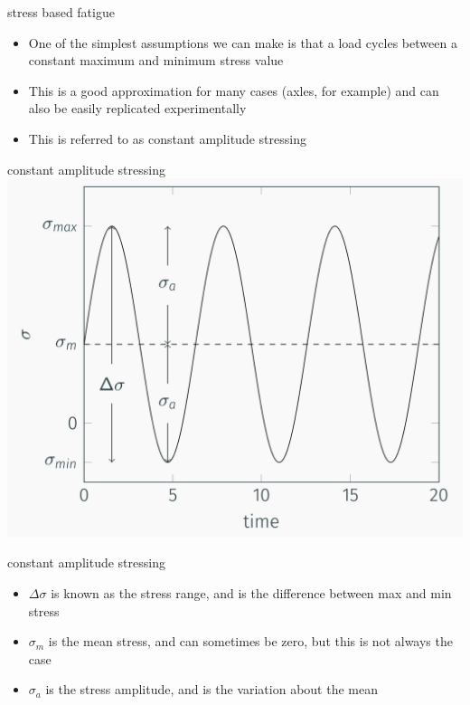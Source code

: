 \documentclass[
  letterpaper,
  ignorenonframetext,
  aspectratio=43,
  handout,
  12pt]{beamer}
\providecommand{\tightlist}{%
  \setlength{\itemsep}{0pt}\setlength{\parskip}{0pt}}
\providecommand{\tightlist}{%
\setlength{\itemsep}{0pt}\setlength{\parskip}{0pt}}
\let\Oldincludegraphics\includegraphics
\renewcommand{\includegraphics}[2][]{\Oldincludegraphics[width=\textwidth,height=0.7\textheight,keepaspectratio]{#2}}
\begin{document}
\begin{frame}{stress based fatigue}
\protect\hypertarget{stress-based-fatigue}{}
\begin{itemize}
\tightlist
\item
  One of the simplest assumptions we can make is that a load cycles
  between a constant maximum and minimum stress value
\item
  This is a good approximation for many cases (axles, for example) and
  can also be easily replicated experimentally
\item
  This is referred to as constant amplitude stressing
\end{itemize}
\end{frame}

\begin{frame}{constant amplitude stressing}
\protect\hypertarget{constant-amplitude-stressing}{}
\includegraphics{../images/fatigue-constant-amplitude.PNG}
\end{frame}

\begin{frame}{constant amplitude stressing}
\protect\hypertarget{constant-amplitude-stressing-1}{}
\begin{itemize}
\tightlist
\item
  \(\Delta \sigma\) is known as the stress range, and is the difference
  between max and min stress
\item
  \(\sigma_m\) is the mean stress, and can sometimes be zero, but this
  is not always the case
\item
  \(\sigma_a\) is the stress amplitude, and is the variation about the
  mean
\end{itemize}
\end{frame}
\end{document}
